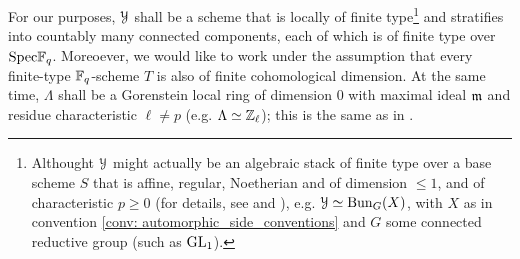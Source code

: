             \begin{convention} \label{conv: trace_formula_conventions}
                For our purposes, $\mathcal{Y}$ shall be a scheme that is locally of finite type\footnote{Althought $\mathcal{Y}$ might actually be an algebraic stack of finite type over a base scheme $S$ that is affine, regular, Noetherian and of dimension $\leq 1$, and of characteristic $p \geq 0$ (for details, see \cite{laszlo_olsson_adic_sheaves_on_artin_stacks_1} and \cite{laszlo_olsson_adic_sheaves_on_artin_stacks_2}), e.g. $\mathcal{Y} \simeq \mathrm{Bun}_G(X)$, with $X$ as in convention \ref{conv: automorphic_side_conventions} and $G$ some connected reductive group (such as $\operatorname{GL}_1$).} and stratifies into countably many connected components, each of which is of finite type over $\mathrm{Spec} \mathbb{F}_q$. Moreoever, we would like to work under the assumption that every finite-type $\mathbb{F}_q$-scheme $T$ is also of finite cohomological dimension. At the same time, $\Lambda$ shall be a Gorenstein local ring of dimension $0$ with maximal ideal $\mathfrak{m}$ and residue  characteristic $\ell \not = p$ (e.g. $\Lambda \simeq \mathbb{Z}_{\ell}$); this is the same as in \cite{laszlo_olsson_adic_sheaves_on_artin_stacks_1}.
            \end{convention}
            
